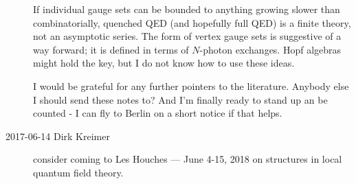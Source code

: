 \begin{description}
If individual gauge sets can be bounded to anything growing slower than
combinatorially, quenched QED (and hopefully full QED) is a finite
theory, not an asymptotic series. The form of vertex gauge sets is
suggestive of a way forward; it is defined in terms of $N$-photon
exchanges. Hopf algebras might hold the key, but I do not know how to use
these ideas.

I would be grateful for any further pointers to the literature.
Anybody else I should send these notes to? And I'm
finally ready to stand up an be counted - I can fly to Berlin on a short
notice if that helps.

%

\item[2017-06-14 Dirk Kreimer]
consider coming to
{Les Houches — June 4-15, 2018} on structures in local quantum field theory.



\end{description}
